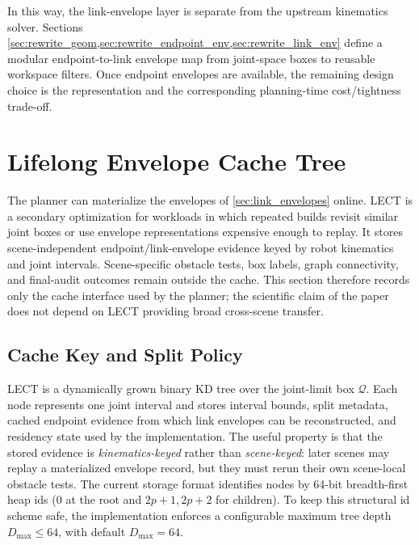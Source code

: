 \documentclass[journal]{IEEEtran}
\newcommand{\Q}{\ensuremath{\mathcal{Q}}}
\begin{document}
In this way, the link-envelope layer is separate from the upstream kinematics solver.
Sections \cref{sec:rewrite_geom,sec:rewrite_endpoint_env,sec:rewrite_link_env}
define a modular endpoint-to-link envelope map from joint-space boxes to reusable
workspace filters. Once endpoint envelopes are available, the remaining design
choice is the representation and the corresponding planning-time cost/tightness
trade-off.

\section{Lifelong Envelope Cache Tree}\label{sec:lect}

The planner can materialize the envelopes of \cref{sec:link_envelopes} online.
LECT is a secondary optimization for workloads in which repeated builds revisit
similar joint boxes or use envelope representations expensive enough to replay.
It stores scene-independent endpoint/link-envelope evidence keyed by robot
kinematics and joint intervals. Scene-specific obstacle tests, box labels,
graph connectivity, and final-audit outcomes remain outside the cache. This
section therefore records only the cache interface used by the planner; the
scientific claim of the paper does not depend on LECT providing broad
cross-scene transfer.

\subsection{Cache Key and Split Policy}\label{sec:lect_design}\label{sec:lect_split}

LECT is a dynamically grown binary KD tree over the joint-limit box $\Q$. Each
node represents one joint interval and stores interval bounds, split metadata,
cached endpoint evidence from which link envelopes can be reconstructed, and
residency state used by the implementation. The useful property is that the
stored evidence is \emph{kinematics-keyed} rather than \emph{scene-keyed}: later
scenes may replay a materialized envelope record, but they must rerun their own
scene-local obstacle tests.
The current storage format identifies nodes by 64-bit breadth-first heap ids
($0$ at the root and $2p+1,2p+2$ for children). To keep this structural id
scheme safe, the implementation enforces a configurable maximum tree depth
$D_{\max}\le 64$, with default $D_{\max}=64$.
\end{document}
